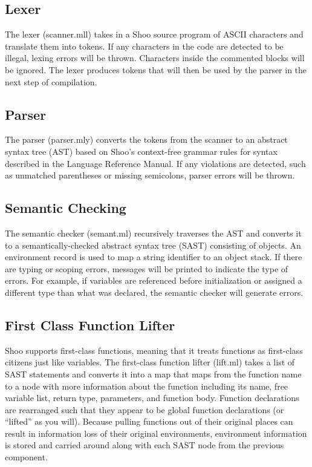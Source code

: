 \documentclass[12pt]{article}
\begin{document}
\subsection{Lexer}
The lexer (scanner.mll) takes in a Shoo source program of ASCII characters and translate them into tokens. If any characters in the code are detected to be illegal, lexing errors will be thrown. Characters inside the commented blocks will be ignored. The lexer produces tokens that will then be used by the parser in the next step of compilation. 

\subsection{Parser}
The parser (parser.mly) converts the tokens from the scanner to an abstract syntax tree (AST) based on Shoo's context-free grammar rules for syntax described in the Language Reference Manual. If any violations are detected, such as unmatched parentheses or missing semicolons, parser errors will be thrown. 

\subsection{Semantic Checking}
The semantic checker (semant.ml) recursively traverses the AST and converts it to a semantically-checked abstract syntax tree (SAST) consisting of objects. An environment record is used to map a string identifier to an object stack. If there are typing or scoping errors, messages will be printed to indicate the type of errors. For example, if variables are referenced before initialization or assigned a different type than what was declared, the semantic checker will generate errors.

\subsection{First Class Function Lifter}
Shoo supports first-class functions, meaning that it treats functions as first-class citizens just like variables. The first-class function lifter (lift.ml) takes a list of SAST statements and converts it into a map that maps from the function name to a node with more information about the function including its name, free variable list, return type, parameters, and function body. Function declarations are rearranged such that they appear to be global function declarations (or ``lifted'' as you will). Because pulling functions out of their original places can result in information loss of their original environments, environment information is stored and carried around along with each SAST node from the previous component.
\end{document}
